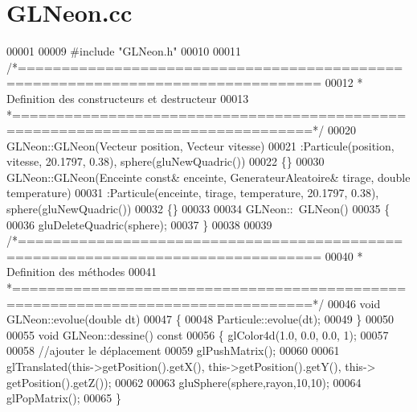 \section{G\+L\+Neon.\+cc}
\label{_g_l_neon_8cc_source}

\begin{DoxyCode}
00001 
00009 \textcolor{preprocessor}{#include "GLNeon.h"}
00010 
00011 \textcolor{comment}{/*================================================================================}
00012 \textcolor{comment}{ * Definition des constructeurs et destructeur}
00013 \textcolor{comment}{ *================================================================================*/}
00020 GLNeon::GLNeon(Vecteur position, Vecteur vitesse)
00021 :Particule(position, vitesse, 20.1797, 0.38), sphere(gluNewQuadric())
00022 \{\}
00030 GLNeon::GLNeon(Enceinte \textcolor{keyword}{const}& enceinte, GenerateurAleatoire& tirage, \textcolor{keywordtype}{double} temperature)
00031 :Particule(enceinte, tirage, temperature, 20.1797, 0.38), sphere(gluNewQuadric())
00032 \{\}
00033 
00034 GLNeon::~GLNeon() 
00035 \{ 
00036     gluDeleteQuadric(sphere); 
00037 \}
00038 
00039 \textcolor{comment}{/*================================================================================}
00040 \textcolor{comment}{ * Definition des méthodes }
00041 \textcolor{comment}{ *================================================================================*/}
00046 \textcolor{keywordtype}{void} GLNeon::evolue(\textcolor{keywordtype}{double} dt)
00047 \{
00048     Particule::evolue(dt);
00049 \}
00050 
00055 \textcolor{keywordtype}{void} GLNeon::dessine()\textcolor{keyword}{ const}
00056 \textcolor{keyword}{}\{   glColor4d(1.0, 0.0, 0.0, 1); 
00057 
00058     \textcolor{comment}{//ajouter le déplacement}
00059     glPushMatrix();
00060     
00061     glTranslated(this->getPosition().getX(), this->getPosition().getY(), this->
      getPosition().getZ());
00062     
00063     gluSphere(sphere,rayon,10,10); 
00064     glPopMatrix();
00065 \}
\end{DoxyCode}
